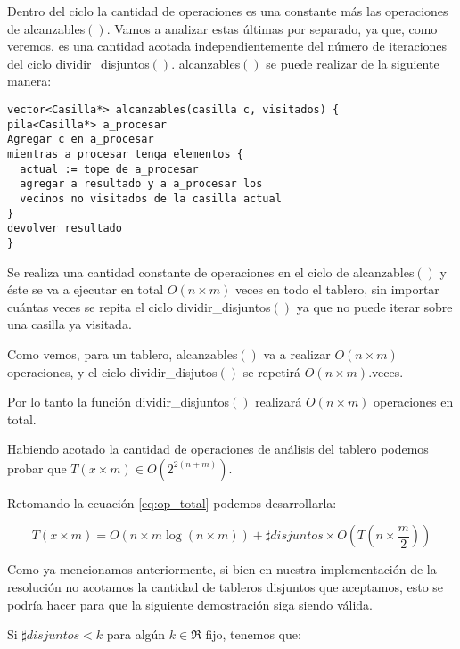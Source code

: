 \documentclass[a4paper, 12pt] {article}
\begin{document}
Dentro del ciclo la cantidad de operaciones es una constante m\'as las operaciones de alcanzables$\left( \right) $. Vamos a analizar estas \'ultimas por separado, ya que, como veremos, es una cantidad acotada independientemente del n\'umero de iteraciones del ciclo dividir\_disjuntos$\left( \right) $.
alcanzables$\left( \right) $ se puede realizar de la siguiente manera:

\begin{verbatim}
vector<Casilla*> alcanzables(casilla c, visitados) {
pila<Casilla*> a_procesar
Agregar c en a_procesar
mientras a_procesar tenga elementos {
  actual := tope de a_procesar
  agregar a resultado y a a_procesar los 
  vecinos no visitados de la casilla actual
}
devolver resultado
}
\end{verbatim}

Se realiza una cantidad constante de operaciones en el ciclo de alcanzables$\left( \right) $ y \'este se va a ejecutar en total $O\left( n\times m\right) $ veces en todo el tablero, sin importar cu\'antas veces se repita el ciclo dividir\_disjuntos$\left( \right) $ ya que no puede iterar sobre una casilla ya visitada.

Como vemos, para un tablero, alcanzables$\left( \right) $ va a realizar $O\left( n \times m\right) $ operaciones, y el ciclo dividir\_disjutos$\left( \right) $ se repetir\'a $O\left( n\times m\right) $.veces.

Por lo tanto la funci\'on dividir\_disjuntos$\left( \right) $ realizar\'a $O\left( n \times m\right) $ operaciones en total.	


Habiendo acotado la cantidad de operaciones de an\'alisis del tablero podemos probar que $T\left( x \times m\right) \in O\left( 2^{2\left( n+m\right) }\right) $.

Retomando la ecuaci\'on \ref{eq:op_total} podemos desarrollarla:

\begin{equation}
T\left( x \times m\right) = O\left( n\times m \log \left( n\times m\right) \right) + \sharp disjuntos \times O \left( T\left( n \times \frac{m}{2} \right) \right) 
\end{equation}
 

Como ya mencionamos anteriormente, si bien en nuestra implementaci\'on de la resoluci\'on no acotamos la cantidad de tableros disjuntos que aceptamos, esto se podr\'ia hacer para que la siguiente demostraci\'on siga siendo v\'alida.


Si $\sharp disjuntos < k$ para alg\'un  $k \in \Re$  fijo, tenemos que:
\end{document}
